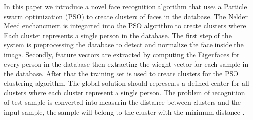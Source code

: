 \documentclass[a4paper,twoside]{article}
\begin{document}
In this paper we introduce a novel face recognition algorithm that uses a Particle swarm optimization (PSO) to create clusters of faces in the database. The Nelder Meed enchancment is integarted into the PSO algorithm to create clusters where Each cluster represents a single person in the database.  The first step of the system is preprocessing the database to detect and normalize the face inside the image. Secondly, feature vectors are extracted by computing the  Eigenfaces for every person in the database then extracting the wieght vector for each sample in the database. After that the training set is used to create clusters for the PSO clustering algorithm. The global solution should represents a defined center for all clusters where each cluster represent a single person. The problem of recognition of test sample is converted into measurin the distance between clusters and the input sample, the  sample will belong to the cluster with the minimum distance . %

\end{document}
